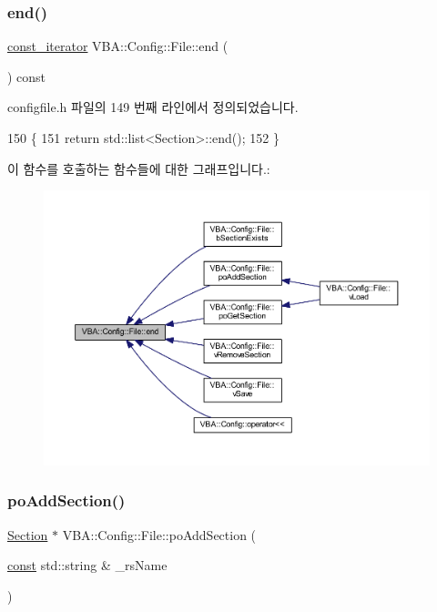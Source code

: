 \subsubsection{\texorpdfstring{end()}{end()}}
{\footnotesize\ttfamily \mbox{\hyperlink{class_v_b_a_1_1_config_1_1_file_a3c4cd2c1e02bbe2dfff43c4e89c71edb}{const\+\_\+iterator}} V\+B\+A\+::\+Config\+::\+File\+::end (\begin{DoxyParamCaption}{ }\end{DoxyParamCaption}) const\hspace{0.3cm}{\ttfamily [inline]}}



configfile.\+h 파일의 149 번째 라인에서 정의되었습니다.


\begin{DoxyCode}
150     \{
151       \textcolor{keywordflow}{return} std::list<Section>::end();
152     \}
\end{DoxyCode}
이 함수를 호출하는 함수들에 대한 그래프입니다.\+:
\nopagebreak
\begin{figure}[H]
\begin{center}
\leavevmode
\includegraphics[width=350pt]{class_v_b_a_1_1_config_1_1_file_a809724e386bf59c8726c33e822890c70_icgraph}
\end{center}
\end{figure}
\mbox{\label{class_v_b_a_1_1_config_1_1_file_a8a785523724a50c1d40a50ea6ada6a4c}} 
\subsubsection{\texorpdfstring{po\+Add\+Section()}{poAddSection()}}
{\footnotesize\ttfamily \mbox{\hyperlink{class_v_b_a_1_1_config_1_1_section}{Section}} $\ast$ V\+B\+A\+::\+Config\+::\+File\+::po\+Add\+Section (\begin{DoxyParamCaption}\item[{\mbox{\hyperlink{getopt1_8c_a2c212835823e3c54a8ab6d95c652660e}{const}} std\+::string \&}]{\+\_\+rs\+Name }\end{DoxyParamCaption})}



